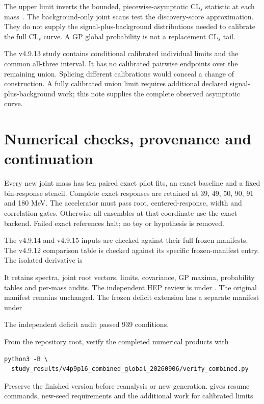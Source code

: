 \documentclass[11pt]{article}
\begin{document}
The upper limit inverts the bounded, piecewise-asymptotic CL$_s$ statistic at each mass~\cite{cowan}. The background-only joint scans test the discovery-score approximation. They do not supply the signal-plus-background distributions needed to calibrate the full CL$_s$ curve. A GP global probability is not a replacement CL$_s$ tail.

The v4.9.13 study contains conditional calibrated individual limits and the common all-three interval. It has no calibrated pairwise endpoints over the remaining union. Splicing different calibrations would conceal a change of construction. A fully calibrated union limit requires additional declared signal-plus-background work; this note supplies the complete observed asymptotic curve.

\clearpage
\section{Numerical checks, provenance and continuation}


Every new joint mass has ten paired exact pilot fits, an exact baseline and a fixed bin-response stencil. Complete exact responses are retained at 39, 49, 50, 90, 91 and 180 MeV. The accelerator must pass root, centered-response, width and correlation gates. Otherwise all ensembles at that coordinate use the exact backend. Failed exact references halt; no toy or hypothesis is removed.

The v4.9.14 and v4.9.15 inputs are checked against their full frozen manifests. The v4.9.12 comparison table is checked against its specific frozen-manifest entry. The isolated derivative is
\begin{center}\small{}\end{center}
It retains spectra, joint root vectors, limits, covariance, GP maxima, probability tables and per-mass audits. The independent HEP review is under . The original manifest remains unchanged. The frozen deficit extension has a separate manifest under
\begin{center}\small{}\end{center}
The independent deficit audit passed 939 conditions.

From the repository root, verify the completed numerical products with
\begin{verbatim}
python3 -B \
  study_results/v4p9p16_combined_global_20260906/verify_combined.py
\end{verbatim}
Preserve the finished version before reanalysis or new generation.  gives resume commands, new-seed requirements and the additional work for calibrated limits.
\end{document}
